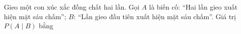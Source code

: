 \begin{ex}
Gieo một con xúc xắc đồng chất hai lần. Gọi $A$ là biến cố: ``Hai lần gieo xuất hiện mặt sáu chấm''; $B$: ``Lần gieo đầu tiên xuất hiện mặt sáu chấm''. Giá trị $P(A\mid B)$ bằng
\end{ex}
